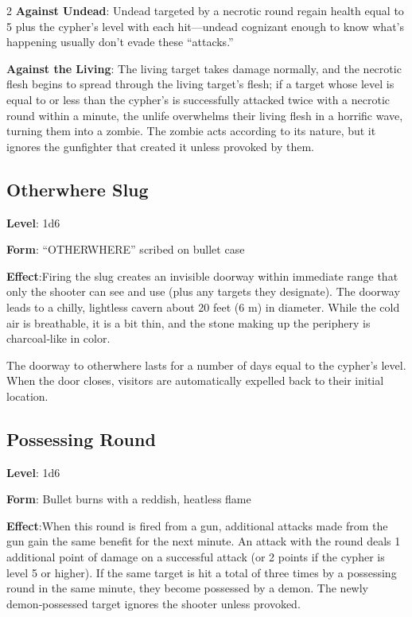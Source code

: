 \begin{multicols}{2}
\textbf{Against Undead}: Undead targeted by a necrotic round regain health equal to 5 plus the cypher’s level with each hit—undead cognizant enough to know what’s happening usually don’t evade these “attacks.” 

\textbf{Against the Living}: The living target takes damage normally, and the necrotic flesh begins to spread through the living target’s flesh; if a target whose level is equal to or less than the cypher’s is successfully attacked twice with a necrotic round within a minute, the unlife overwhelms their living flesh in a horrific wave, turning them into a zombie. The zombie acts according to its nature, but it ignores the gunfighter that created it unless provoked by them. 

\subsection{Otherwhere Slug}

\textbf{Level}: 1d6 

\textbf{Form}: “OTHERWHERE” scribed on bullet case 

\textbf{Effect}:Firing the slug creates an invisible doorway within immediate range that only the shooter can see and use (plus any targets they designate). The doorway leads to a chilly, lightless cavern about 20 feet (6 m) in diameter. While the cold air is breathable, it is a bit thin, and the stone making up the periphery is charcoal‑like in color. 

The doorway to otherwhere lasts for a number of days equal to the cypher’s level. When the door closes, visitors are automatically expelled back to their initial location. 

\subsection{Possessing Round}

\textbf{Level}: 1d6 

\textbf{Form}: Bullet burns with a reddish, heatless flame 

\textbf{Effect}:When this round is fired from a gun, additional attacks made from the gun gain the same benefit for the next minute. An attack with the round deals 1 additional point of damage on a successful attack (or 2 points if the cypher is level 5 or higher). If the same target is hit a total of three times by a possessing round in the same minute, they become possessed by a demon. The newly demon‑possessed target ignores the shooter unless provoked. 


\end{multicols}
